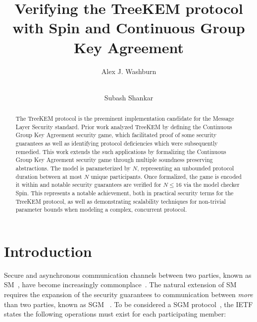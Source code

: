 \documentclass[runningheads]{llncs}
\newcommand{\Abrev}[1]{\gls{#1}}
\begin{document}
%
\title{Verifying the TreeKEM protocol with Spin and Continuous Group Key Agreement}
%
%
\author{Alex J. Washburn \and\\
Subash Shankar}
%
%

%
%
\maketitle              %
%
\begin{abstract}
The TreeKEM protocol is the preeminent implementation candidate for the Message Layer Security standard.
Prior work analyzed TreeKEM by defining the Continuous Group Key Agreement security game,
which facilitated proof of some security guarantees as well as identifying protocol deficiencies which were subsequently remedied.
This work extends the such applications by formalizing the Continuous Group Key Agreement security game through multiple soundness preserving abstractions.
The model is parameterized by $N$, representing an unbounded protocol duration between at most $N$ unique participants.
Once formalized, the game is encoded it within \Promela and notable security guarantees are verified for $N \le 16$ via the model checker Spin.
This represents a notable achievement, both in practical security terms for the TreeKEM protocol, as well as demonstrating scalability techniques for non-trivial parameter bounds when modeling a complex, concurrent protocol.

\end{abstract}



%
%
%
\section{Introduction}

Secure and asynchronous communication channels between two parties, known as \Abrev{SM}~\cite{unger2015sok}, have become increasingly commonplace~\cite{schroder2016signal,vaziripour2017you,jahn2018usability}.
The natural extension of \Abrev{SM} requires the expansion of the security guarantees to communication between \emph{more} than two parties, known as \Abrev{SGM} ~\cite{cohn2018ends}.
To be considered a \Abrev{SGM} protocol~\cite{ietf-mls-protocol-14}, the \Abrev{IETF} states the following operations must exist for each participating member:
\end{document}
